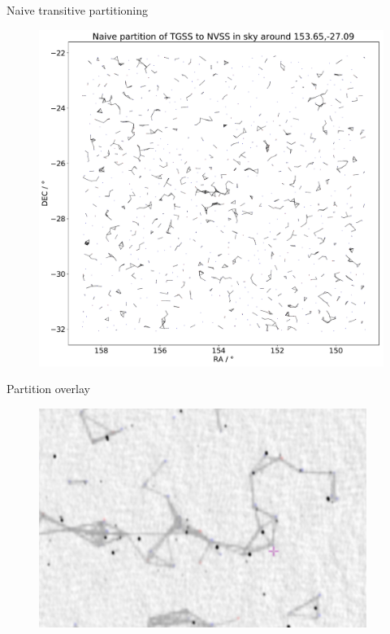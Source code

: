 \documentclass[12pt]{beamer}
\begin{document}
\begin{frame}{Naive transitive partitioning}
\begin{figure}
    \centering
    \includegraphics[height=0.85\textheight]{pics/torch_lr_partition.pdf}
\end{figure}
\end{frame}

\begin{frame}{Partition overlay}
\begin{figure}
    \centering
    \includegraphics[width=0.95\textwidth]{pics/overlayoverlay.png}
\end{figure}
\end{frame}
\end{document}
